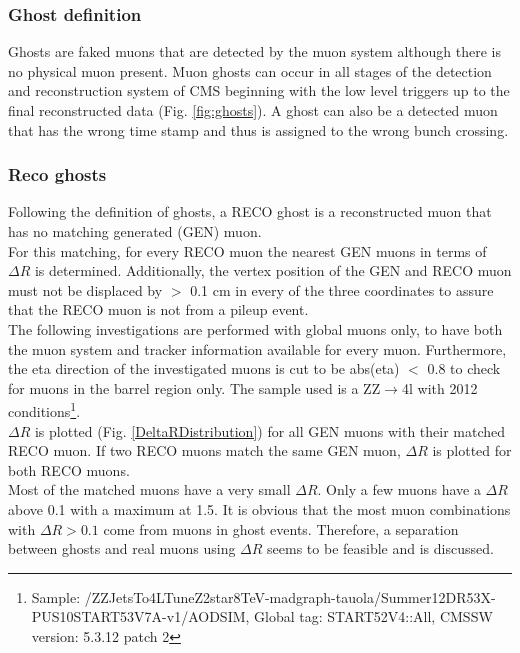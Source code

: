 \subsubsection{Ghost definition}
Ghosts are faked muons that are detected by the muon system although there is no physical muon present.
Muon ghosts can occur in all stages of the detection and reconstruction system of CMS beginning with the low level triggers up to the final reconstructed data (Fig. \ref{fig:ghosts}).
A ghost can also be a detected muon that has the wrong time stamp and thus is assigned to the wrong bunch crossing.

\subsubsection{Reco ghosts}
Following the definition of ghosts, a RECO ghost is a reconstructed muon that has no matching generated (GEN) muon.\\
For this matching, for every RECO muon the nearest GEN muons in terms of $\Delta R$ is determined. Additionally, the vertex position of the GEN and RECO muon must not be displaced by $>$ 0.1 cm in every of the three coordinates to assure that the RECO muon is not from a pileup event.\\
The following investigations are performed with global muons only, to have both the muon system and tracker information available for every muon. Furthermore, the eta direction of the investigated muons is cut to be abs(eta) $<$ 0.8 to check for muons in the barrel region only. The sample used is a ZZ$\to$4l with 2012 conditions\footnote{Sample: /ZZJetsTo4L\textunderscore TuneZ2star\textunderscore 8TeV-madgraph-tauola/Summer12\textunderscore DR53X-PU\textunderscore S10\textunderscore START53\textunderscore V7A-v1/AODSIM, Global tag: START52\textunderscore V4::All, CMSSW version: 5.3.12 patch 2}.\\
$\Delta R$ is plotted (Fig. \ref{DeltaRDistribution}) for all GEN muons with their matched RECO muon. If two RECO muons match the same GEN muon, $\Delta R$ is plotted for both RECO muons.\\
Most of the matched muons have a very small $\Delta R$. Only a few muons have a $\Delta R$ above 0.1 with a maximum at 1.5. It is obvious that the most muon combinations with $\Delta R > 0.1$ come from muons in ghost events. Therefore, a separation between ghosts and real muons using $\Delta R$ seems to be feasible and is discussed.
